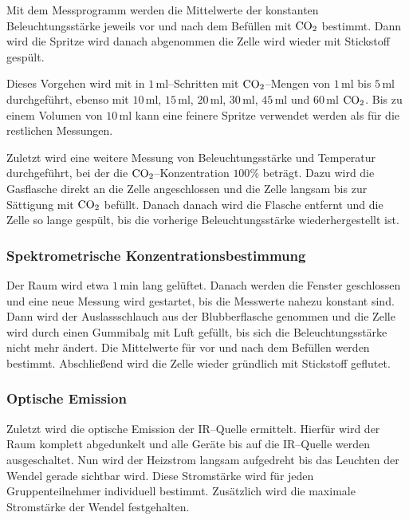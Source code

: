\documentclass[12pt,a4paper]{scrartcl}
\numberwithin{equation}{section} %
\begin{document}
	Mit dem Messprogramm werden die Mittelwerte der konstanten Beleuchtungsstärke jeweils vor und nach dem Befüllen mit $\ce{CO_2}$ bestimmt. Dann wird die Spritze wird danach abgenommen die Zelle wird wieder mit Stickstoff gespült.
	
	Dieses Vorgehen wird mit in $1\mathrm{\,ml}$--Schritten mit $\ce{CO_2}$--Mengen von $1\mathrm{\,ml}$ bis $5\mathrm{\,ml}$ durchgeführt, ebenso mit $10\mathrm{\,ml}$, $15\mathrm{\,ml}$, $20\mathrm{\,ml}$, $30\mathrm{\,ml}$, $45\mathrm{\,ml}$ und $60\mathrm{\,ml}$ $\ce{CO_2}$. Bis zu einem Volumen von $10\mathrm{\,ml}$ kann eine feinere Spritze verwendet werden als für die restlichen Messungen.
	
	Zuletzt wird eine weitere Messung von Beleuchtungsstärke und Temperatur durchgeführt, bei der die $\ce{CO_2}$--Konzentration $100\%$ beträgt. Dazu wird die  Gasflasche direkt an die Zelle angeschlossen und die Zelle langsam bis zur Sättigung mit $\ce{CO_2}$ befüllt. Danach danach wird die Flasche entfernt und die Zelle so lange gespült, bis die vorherige Beleuchtungsstärke wiederhergestellt ist.
	
	\subsubsection{Spektrometrische Konzentrationsbestimmung}
	\label{howto:Spektrometrische Konzentrationsbestimmung}
	Der Raum wird etwa $1\mathrm{\,min}$ lang gelüftet. Danach werden die Fenster geschlossen und eine neue Messung wird gestartet, bis die Messwerte nahezu konstant sind. Dann wird der Auslassschlauch aus der Blubberflasche genommen und die Zelle wird durch einen Gummibalg mit Luft gefüllt, bis sich die Beleuchtungsstärke nicht mehr ändert. Die Mittelwerte für vor und nach dem Befüllen werden bestimmt. Abschließend wird die Zelle wieder gründlich mit Stickstoff geflutet.
	
	\subsubsection{Optische Emission}
	\label{howto:Optische Emission}
	Zuletzt wird die optische Emission der IR--Quelle ermittelt. Hierfür wird der Raum komplett abgedunkelt und alle Geräte bis auf die IR--Quelle werden ausgeschaltet. Nun wird der Heizstrom langsam aufgedreht bis das Leuchten der Wendel gerade sichtbar wird. Diese Stromstärke wird für jeden Gruppenteilnehmer individuell bestimmt. Zusätzlich wird die maximale Stromstärke der Wendel festgehalten.
	
\end{document}
